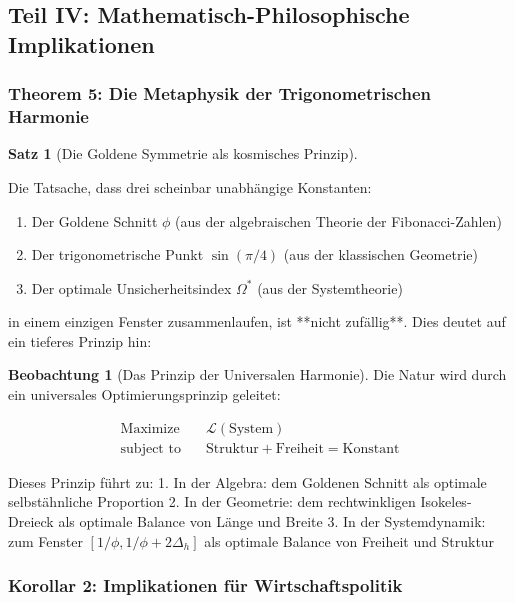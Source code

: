 \documentclass[a4paper,12pt,twoside]{report}
\theoremstyle{definition}
\newtheorem{satz}{Satz}
\newtheorem{beobachtung}{Beobachtung}
\begin{document}
\subsection{Teil IV: Mathematisch-Philosophische Implikationen}

\subsubsection*{Theorem 5: Die Metaphysik der Trigonometrischen Harmonie}

\begin{satz}[Die Goldene Symmetrie als kosmisches Prinzip]
\label{satz:cosmic_harmony}

Die Tatsache, dass drei scheinbar unabhängige Konstanten:

\begin{enumerate}
	\item Der Goldene Schnitt $\phi$ (aus der algebraischen Theorie der Fibonacci-Zahlen)
	\item Der trigonometrische Punkt $\sin(\pi/4)$ (aus der klassischen Geometrie)
	\item Der optimale Unsicherheitsindex $\Omega^*$ (aus der Systemtheorie)
\end{enumerate}

in einem einzigen Fenster zusammenlaufen, ist **nicht zufällig**. Dies deutet auf ein tieferes Prinzip hin:

\begin{beobachtung}[Das Prinzip der Universalen Harmonie]

Die Natur wird durch ein universales Optimierungsprinzip geleitet:

\begin{align}
\text{Maximize} \quad & \mathcal{L}(\text{System}) \\
\text{subject to} \quad & \text{Struktur} + \text{Freiheit} = \text{Konstant}
\end{align}

Dieses Prinzip führt zu:
1. In der Algebra: dem Goldenen Schnitt als optimale selbstähnliche Proportion
2. In der Geometrie: dem rechtwinkligen Isokeles-Dreieck als optimale Balance von Länge und Breite
3. In der Systemdynamik: zum Fenster $[1/\phi, 1/\phi + 2\Delta_h]$ als optimale Balance von Freiheit und Struktur

\end{beobachtung}

\end{satz}

\subsubsection{Korollar 2: Implikationen für Wirtschaftspolitik}
\end{document}
